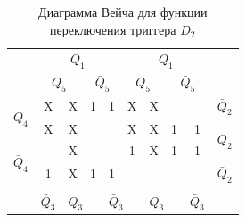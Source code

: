 \documentclass[a4paper,14pt]{article}
\begin{document}
\begin{table}[H]
	\begin{center}
		\caption{\label{tab:D2_tab} Диаграмма Вейча для функции переключения триггера $D_2$ }
		\begin{tabular}{cccccccccc}
			& \multicolumn{4}{c}{$Q_1$} & \multicolumn{4}{c}{$\bar{Q}_1$} &  \\
			& \multicolumn{2}{c}{$Q_5$} & \multicolumn{2}{c}{$\bar{Q}_5$} & \multicolumn{2}{c}{$Q_5$} & \multicolumn{2}{c}{$\bar{Q}_5$} &  \\ \cline{2-9}
			\multicolumn{1}{c|}{\multirow{2}{*}{$Q_4$}} & \multicolumn{1}{c|}{X} & \multicolumn{1}{c|}{X} & \multicolumn{1}{c|}{1} & \multicolumn{1}{c|}{1} & \multicolumn{1}{c|}{X} & \multicolumn{1}{c|}{X} & \multicolumn{1}{c|}{} & \multicolumn{1}{c|}{} & $\bar{Q}_2$ \\ \cline{2-9}
			\multicolumn{1}{c|}{} & \multicolumn{1}{c|}{X} & \multicolumn{1}{c|}{X} & \multicolumn{1}{c|}{} & \multicolumn{1}{c|}{} & \multicolumn{1}{c|}{X} & \multicolumn{1}{c|}{X} & \multicolumn{1}{c|}{1} & \multicolumn{1}{c|}{1} & \multirow{2}{*}{$Q_2$} \\ \cline{2-9}
			\multicolumn{1}{c|}{\multirow{2}{*}{$\bar{Q}_4$}} & \multicolumn{1}{c|}{} & \multicolumn{1}{c|}{X} & \multicolumn{1}{c|}{} & \multicolumn{1}{c|}{} & \multicolumn{1}{c|}{1} & \multicolumn{1}{c|}{X} & \multicolumn{1}{c|}{1} & \multicolumn{1}{c|}{1} &  \\ \cline{2-9}
			\multicolumn{1}{c|}{} & \multicolumn{1}{c|}{1} & \multicolumn{1}{c|}{X} & \multicolumn{1}{c|}{1} & \multicolumn{1}{c|}{1} & \multicolumn{1}{c|}{} & \multicolumn{1}{c|}{} & \multicolumn{1}{c|}{} & \multicolumn{1}{c|}{} & $\bar{Q}_2$ \\ \cline{2-9}
			&  & \multicolumn{2}{c}{} & \multicolumn{2}{c}{} & \multicolumn{2}{c}{} &  &  \\
			\multicolumn{1}{l}{} & \multicolumn{1}{l}{$\bar{Q}_3$} & \multicolumn{2}{l}{$Q_3$} & \multicolumn{2}{l}{$\bar{Q}_3$} & \multicolumn{2}{l}{$Q_3$} & \multicolumn{1}{l}{$\bar{Q}_3$} & \multicolumn{1}{l}{}
		\end{tabular}
	\end{center}
\end{table}

\end{document}
